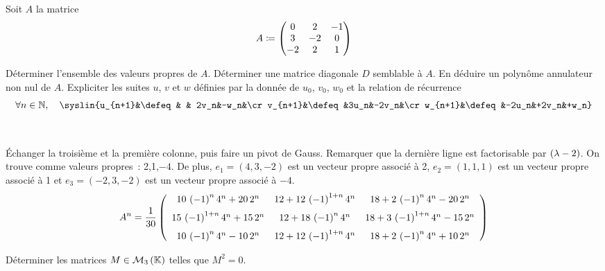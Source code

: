 \documentclass{magnolia}
\begin{document}
Soit $A$ la matrice
\[A\coloneqq
  \begin{pmatrix}
  0  & 2  & -1\\
  3 & -2  & 0\\
  -2  & 2  & 1  
  \end{pmatrix}\]
\begin{questions}
\question Déterminer l'ensemble des valeurs propres de $A$.
\question Déterminer une matrice diagonale $D$ semblable à $A$. En déduire un
  polynôme annulateur non nul de $A$.
\question Expliciter les suites $u$, $v$ et $w$ définies par la donnée de
  $u_0$, $v_0$, $w_0$ et la relation de récurrence
  \[\forall n\in\N\qsep \syslin{u_{n+1}&\defeq&    & 2v_n&-w_n&\cr
            v_{n+1}&\defeq&3u_n&-2v_n&\cr
            w_{n+1}&\defeq&-2u_n&+2v_n&+w_n}\]
\end{questions}
\begin{sol}
$\quad$  
\begin{questions}
\question Échanger la troisième et la première colonne, puis faire un pivot de
  Gauss. Remarquer que la dernière ligne est factorisable par $\left(\lambda-2\right)$.
  On trouve comme valeurs propres~: 2,1,$-4$.
  De plus, $e_1=(4,3,-2)$ est un vecteur propre associé à 2, $e_2=(1,1,1)$
  est un vecteur propre associé à 1 et $e_3=(-2,3,-2)$ est un vecteur
  propre associé à $-4$.
\question
\question
  \[A^n=\frac{1}{30}\left( \begin {array}{ccc} 10\, \left( -1 \right) ^{n}{4}^{n}+20\,{2}
  ^{n}&12+12\, \left( -1 \right) ^{1+n}{4}^{n}&18+2\, \left( -1 \right) 
  ^{n}{4}^{n}-20\,{2}^{n}\\\noalign{\medskip}15\, \left( -1 \right) ^{1+
  n}{4}^{n}+15\,{2}^{n}&12+18\, \left( -1 \right) ^{n}{4}^{n}&18+3\,
   \left( -1 \right) ^{1+n}{4}^{n}-15\,{2}^{n}\\\noalign{\medskip}10\,
   \left( -1 \right) ^{n}{4}^{n}-10\,{2}^{n}&12+12\, \left( -1 \right) ^
  {1+n}{4}^{n}&18+2\, \left( -1 \right) ^{n}{4}^{n}+10\,{2}^{n}
  \end {array} \right) \]
\end{questions}
\end{sol}

Déterminer les matrices $M\in\mathcal{M}_{3}\left(\mathbb{K}\right)$ telles que $M^2=0$.
\end{document}
